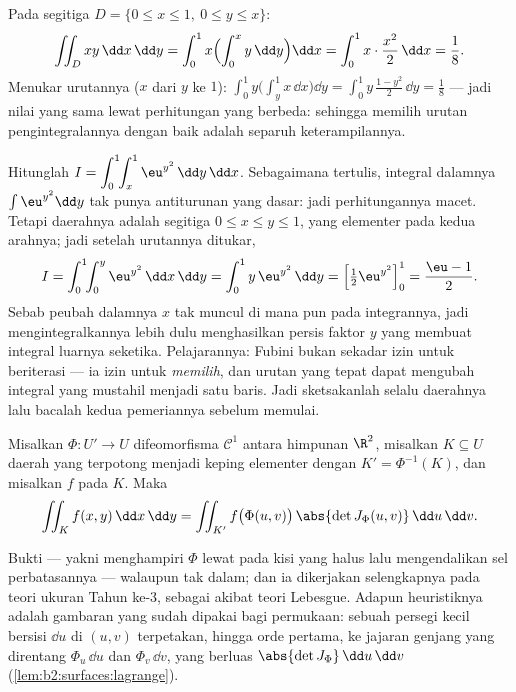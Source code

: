\begin{example}\label{ex:b2:multint:triangle}
Pada segitiga $D = \{0 \leq x \leq 1,\ 0 \leq y \leq x\}$:
\[
\iint_D xy \,\dd x\,\dd y
= \int_0^1 x\Bigl(\int_0^x y\,\dd y\Bigr)\dd x
= \int_0^1 x\cdot\frac{x^2}{2}\,\dd x = \frac18 .
\]
Menukar urutannya ($x$ dari $y$ ke $1$): $\int_0^1
y\bigl(\int_y^1 x\,\dd x\bigr)\dd y = \int_0^1
y\,\frac{1 - y^2}{2}\,\dd y = \frac18$ --- jadi nilai yang sama lewat
perhitungan yang berbeda: sehingga memilih urutan pengintegralannya dengan baik adalah separuh
keterampilannya.
\end{example}

\begin{example}\label{ex:b2:multint:swaporder}
Hitunglah $I = \displaystyle\int_0^1\!\!\int_x^1
\eu^{y^2}\,\dd y\,\dd x$. Sebagaimana tertulis, integral dalamnya
$\int\eu^{y^2}\dd y$ tak punya antiturunan yang dasar: jadi
perhitungannya macet. Tetapi daerahnya adalah segitiga $0 \leq
x \leq y \leq 1$, yang elementer pada kedua arahnya; jadi setelah
urutannya ditukar,
\[
I = \int_0^1\!\!\int_0^y \eu^{y^2}\,\dd x\,\dd y
= \int_0^1 y\,\eu^{y^2}\,\dd y
= \Bigl[\tfrac12\eu^{y^2}\Bigr]_0^1 = \frac{\eu - 1}{2} .
\]
Sebab peubah dalamnya $x$ tak muncul di mana pun pada integrannya, jadi
mengintegralkannya lebih dulu menghasilkan persis faktor $y$ yang
membuat integral luarnya seketika. Pelajarannya: Fubini bukan sekadar
izin untuk beriterasi --- ia izin untuk \emph{memilih},
dan urutan yang tepat dapat mengubah integral yang mustahil menjadi
satu baris. Jadi sketsakanlah selalu daerahnya lalu bacalah kedua
pemeriannya sebelum memulai.
\end{example}

\begin{theorem}\label{thm:b2:multint:changevar}
Misalkan $\Phi \colon U' \to U$ difeomorfisma $\mathcal{C}^1$
antara himpunan  $\R^2$, misalkan $K \subseteq U$ daerah 
yang terpotong menjadi keping elementer dengan $K' = \Phi^{-1}(K)$, dan
misalkan $f$  pada $K$. Maka
\[
\iint_K f(x, y)\,\dd x\,\dd y
= \iint_{K'} f\bigl(\Phi(u, v)\bigr)\,
\abs{\det J_\Phi(u, v)}\,\dd u\,\dd v .
\]
\end{theorem}
\admitted

\begin{remark}
Bukti  --- yakni menghampiri $\Phi$ lewat  pada
kisi yang halus lalu mengendalikan sel perbatasannya ---  walaupun
tak dalam; dan ia dikerjakan selengkapnya pada teori ukuran Tahun ke-3, sebagai
akibat teori Lebesgue. Adapun heuristiknya adalah gambaran yang
sudah dipakai bagi  permukaan: sebuah persegi kecil bersisi $\dd u$ di
$(u, v)$ terpetakan, hingga orde pertama, ke jajaran genjang yang direntang
$\Phi_u\,\dd u$ dan $\Phi_v\,\dd v$, yang berluas
$\abs{\det J_\Phi}\,\dd u\,\dd v$
(\cref{lem:b2:surfaces:lagrange}).
\end{remark}

